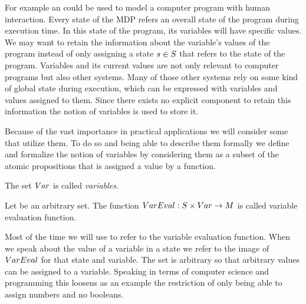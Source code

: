 \documentclass[preview]{standalone}
\begin{document}
For example an \mdpN could be used to model a computer program with human interaction. Every state of the MDP refers an overall state of the program during execution time. In this state of the program, its variables will have specific values. We may want to retain the information about the variable's values of the program instead of only assigning a state ${s} \in {S}$ that refers to the state of the program. Variables and its current values are not only relevant to computer programs but also other systems. Many of those other systems rely on some kind of global state during execution, which can be expressed with variables and values assigned to them. Since there exists no explicit component to retain this information the notion of variables is used to store it.


Because of the vast importance in practical applications we will consider some \viewsN that utilize them. To do so and being able to describe them formally we define and formalize the notion of variables by considering them as a subset of the atomic propositions \atomicprops that is assigned a value by a function.

\begin{definition}
	The set ${Var}$ is called \emph{variables}.
\end{definition}

\begin{definition}
	Let \varevalimg be an arbitrary set. The function ${VarEval} : {S} \times {Var} \to {\ensuremath{{M}}}$ is called variable evaluation function.
\end{definition} 

Most of the time we will use \vareval to refer to the variable evaluation function. When we speak about the value of a variable in a state we refer to the image of ${VarEval}$ for that state and variable. The set \varevalimg is arbitrary so that arbitrary values can be assigned to a variable. Speaking in terms of computer science and programming this loosens as an example the restriction of only being able to assign numbers and no booleans.
\end{document}
